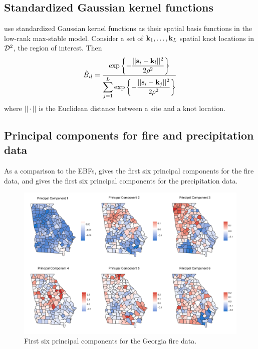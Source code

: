 \documentclass[11pt]{article}
\begin{document}
\subsection{Standardized Gaussian kernel functions} \label{eba:gskfunctions}
\citet{Reich2012} use standardized Gaussian kernel functions as their spatial basis functions in the low-rank max-stable model.
Consider a set of $\mbox{\bf k}_1, \ldots, \mbox{\bf k}_L$ spatial knot locations in ${\cal D}^2$, the region of interest.
Then
\begin{align}
  \hat{B}_{il} = \frac{\exp\left\{- \displaystyle\frac{||\mbox{\bf s}_i - \mbox{\bf k}_l||^2}{2 \rho^2} \right\}}{\displaystyle \sum_{j = 1}^L \exp\left\{- \frac{||\mbox{\bf s}_i - \mbox{\bf k}_j||^2}{2 \rho^2} \right\}}
\end{align}
where $|| \cdot ||$ is the Euclidean distance between a site and a knot location.

\subsection{Principal components for fire and precipitation data}
As a comparison to the EBFs,  gives the first six principal components for the fire data, and  gives the first six principal components for the precipitation data.
\begin{figure}[htbp] %
  \centering
  \includegraphics[width=\linewidth]{plots/fire-eig-panel.pdf}
  \caption{First six principal components for the Georgia fire data.}
  \label{ebfig:fire-eigpanel}
\end{figure}
\end{document}
